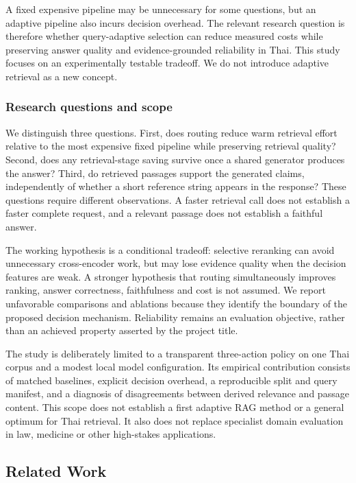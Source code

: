 \documentclass[10pt,a4paper]{article}
\begin{document}
A fixed expensive pipeline may be unnecessary for some questions, but an
adaptive pipeline also incurs decision overhead. The relevant research
question is therefore whether query-adaptive selection can reduce
measured costs while preserving answer quality and evidence-grounded
reliability in Thai. This study focuses on an experimentally testable
tradeoff. We do not introduce adaptive retrieval as a new concept.

\hypertarget{research-questions-and-scope}{%
\subsubsection{Research questions and
scope}\label{research-questions-and-scope}}

We distinguish three questions. First, does routing reduce warm
retrieval effort relative to the most expensive fixed pipeline while
preserving retrieval quality? Second, does any retrieval-stage saving
survive once a shared generator produces the answer? Third, do retrieved
passages support the generated claims, independently of whether a short
reference string appears in the response? These questions require
different observations. A faster retrieval call does not establish a
faster complete request, and a relevant passage does not establish a
faithful answer.

The working hypothesis is a conditional tradeoff: selective reranking
can avoid unnecessary cross-encoder work, but may lose evidence quality
when the decision features are weak. A stronger hypothesis that routing
simultaneously improves ranking, answer correctness, faithfulness and
cost is not assumed. We report unfavorable comparisons and ablations
because they identify the boundary of the proposed decision mechanism.
Reliability remains an evaluation objective, rather than an achieved
property asserted by the project title.

The study is deliberately limited to a transparent three-action policy
on one Thai corpus and a modest local model configuration. Its empirical
contribution consists of matched baselines, explicit decision overhead,
a reproducible split and query manifest, and a diagnosis of
disagreements between derived relevance and passage content. This scope
does not establish a first adaptive RAG method or a general optimum for
Thai retrieval. It also does not replace specialist domain evaluation in
law, medicine or other high-stakes applications.

\hypertarget{related-work}{%
\subsection{Related Work}\label{related-work}}
\end{document}
